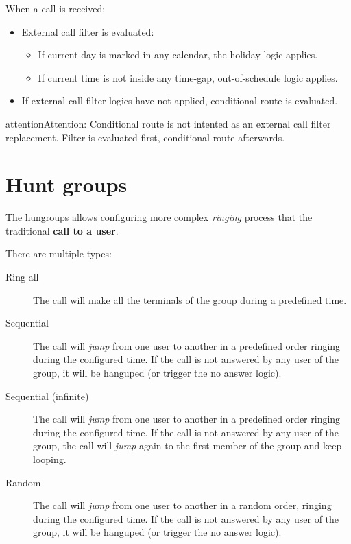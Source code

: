 \documentclass[letterpaper,10pt,english]{sphinxmanual}
\begin{document}
When a call is received:
\begin{itemize}
\item {} 
External call filter is evaluated:
\begin{itemize}
\item {} 
If current day is marked in any calendar, the holiday logic applies.

\item {} 
If current time is not inside any time-gap, out-of-schedule logic applies.

\end{itemize}

\item {} 
If external call filter logics have not applied, conditional route is evaluated.

\end{itemize}

\begin{notice}{attention}{Attention:}
Conditional route is not intented as an external call filter
replacement. Filter is evaluated first, conditional route afterwards.
\end{notice}


\section{Hunt groups}
\label{pbx_features/huntgroups:hunt-groups}\label{pbx_features/huntgroups::doc}\label{pbx_features/huntgroups:huntgroups}
The hungroups allows configuring more complex \emph{ringing} process that the
traditional \textbf{call to a user}.

There are multiple types:
\begin{description}
\item[{Ring all}] \leavevmode{}\label{pbx_features/huntgroups:term-ring-all}
The call will make all the terminals of the group during a predefined
time.

\item[{Sequential}] \leavevmode{}\label{pbx_features/huntgroups:term-sequential}
The call will \emph{jump} from one user to another in a predefined order
ringing during the configured time. If the call is not answered by any
user of the group, it will be hanguped (or trigger the no answer logic).

\item[{Sequential (infinite)}] \leavevmode{}\label{pbx_features/huntgroups:term-sequential-infinite}
The call will \emph{jump} from one user to another in a predefined order
ringing during the configured time. If the call is not answered by any
user of the group, the call will \emph{jump} again to the first member of the
group and keep looping.

\item[{Random}] \leavevmode{}\label{pbx_features/huntgroups:term-random}
The call will \emph{jump} from one user to another in a random order,
ringing during the configured time.  If the call is not answered by any
user of the group, it will be hanguped (or trigger the no answer logic).

\end{description}
\end{document}
